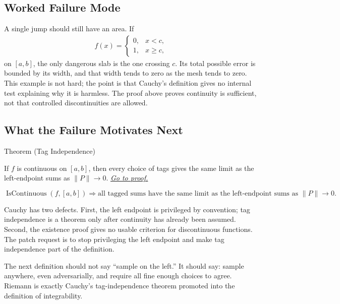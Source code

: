 \subsection*{Worked Failure Mode}

\begin{remark*}[Interpretation]
A single jump should still have an area. If
\[
\begin{aligned}
  f(x)=
  \begin{cases}
    0,&x<c,\\
    1,&x\ge c,
  \end{cases}
\end{aligned}
\]
on \([a,b]\), the only dangerous slab is the one crossing \(c\). Its total
possible error is bounded by its width, and that width tends to zero as the
mesh tends to zero. This example is not hard; the point is that Cauchy's
definition gives no internal test explaining why it is harmless. The proof
above proves continuity is sufficient, not that controlled discontinuities are
allowed.
\end{remark*}

\subsection*{What the Failure Motivates Next}

\begin{theorembox}{Theorem (Tag Independence)}
\begin{theorem}
\label{thm:cauchy-tag-independence}

If \(f\) is continuous on \([a,b]\), then every choice of tags gives the same
limit as the left-endpoint sums as \(\|P\|\to 0\).
\hyperref[prf:cauchy-tag-independence]{\textit{Go to proof.}}
\end{theorem}
\end{theorembox}

\begin{remark*}
\[
\operatorname{IsContinuous}(f,[a,b])
\Longrightarrow
\text{all tagged sums have the same limit as the left-endpoint sums as }\|P\|\to0.
\]
\end{remark*}

\begin{remark*}[Interpretation]
Cauchy has two defects. First, the left endpoint is privileged by convention;
tag independence is a theorem only after continuity has already been assumed.
Second, the existence proof gives no usable criterion for discontinuous
functions. The patch request is to stop privileging the left endpoint and make
tag independence part of the definition.


The next definition should not say ``sample on the left.'' It should say:
sample anywhere, even adversarially, and require all fine enough choices to
agree. Riemann is exactly Cauchy's tag-independence theorem promoted into the
definition of integrability.
\end{remark*}


